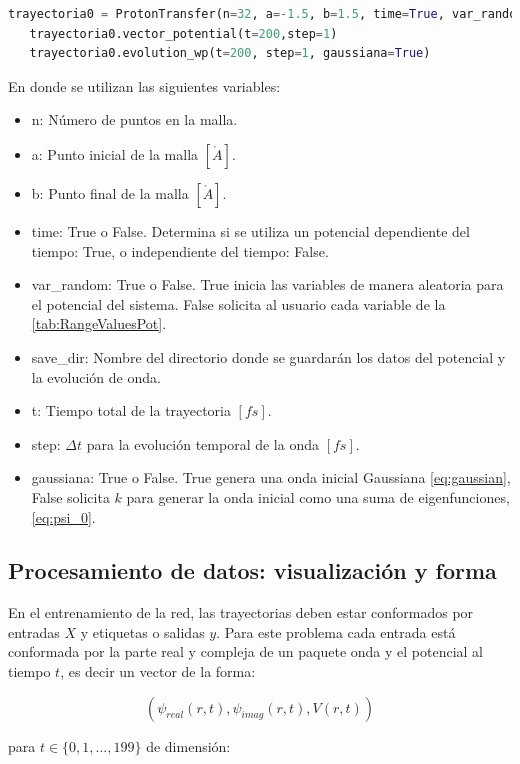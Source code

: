  \begin{lstlisting}[language=Python, morekeywords={ProtonTransfer, True, False}]
   trayectoria0 = ProtonTransfer(n=32, a=-1.5, b=1.5, time=True, var_random=True, save_dir='data0')
   trayectoria0.vector_potential(t=200,step=1)
   trayectoria0.evolution_wp(t=200, step=1, gaussiana=True)\end{lstlisting}

En donde se utilizan las siguientes variables:
\begin{itemize}[label=\textcolor{CTtitle}{\textbullet}]
\item n: Número de puntos en la malla.
\item a: Punto inicial de la malla $[\mathring{A}]$.
\item b: Punto final de la malla $[\mathring{A}]$.
\item time: True o False. Determina si se utiliza un potencial dependiente del tiempo: True, o independiente del tiempo: False.  
\item var\_random: True o False. True inicia las variables de manera aleatoria para el potencial del sistema. False solicita al usuario cada variable de la \autoref{tab:RangeValuesPot}.
\item save\_dir: Nombre del directorio donde se guardarán los datos del potencial y la evolución de onda.
\item t: Tiempo total de la trayectoria $[fs]$.
\item step: $\Delta t$ para la evolución temporal de la onda $[fs]$.
\item gaussiana: True o False. True genera una onda inicial Gaussiana \autoref{eq:gaussian}, False solicita $k$ para generar la onda inicial como una suma de eigenfunciones, \autoref{eq:psi_0}. 
\end{itemize}

\subsection{Procesamiento de datos: visualización y forma}\label{sec:6.4.2}

En el entrenamiento de la red, las trayectorias deben estar conformados por entradas $X$ y etiquetas o salidas $y$. Para este problema cada entrada está conformada por la parte real y compleja de un paquete onda y el potencial al tiempo $t$, es decir un vector de la forma:

$$(\psi_{real}(r,t), \psi_{imag}(r,t),V(r,t))$$

para $t \in \{0,1,\dots,199\}$ de dimensión:


